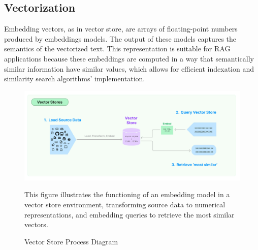 \subsection{Vectorization}
Embedding vectors, as in vector store, are arrays of floating-point numbers produced by embeddings models. The output of these models captures the semantics of the vectorized text. This representation is suitable for RAG applications because these embeddings are computed in a way that semantically similar information have similar values, which allows for efficient indexation and similarity search algorithms' implementation.
\begin{figure}[H]
    \centering
    \includegraphics[width=\linewidth]{./figures/vectorstore.jpg}
    \caption{Vector Store Process Diagram \cite{langchainvectorstore}}
    \begin{flushleft}
        \small This figure illustrates the functioning of an embedding model in a vector store environment, transforming source data to numerical representations, and embedding queries to retrieve the most similar vectors.
    \end{flushleft}
\end{figure}
